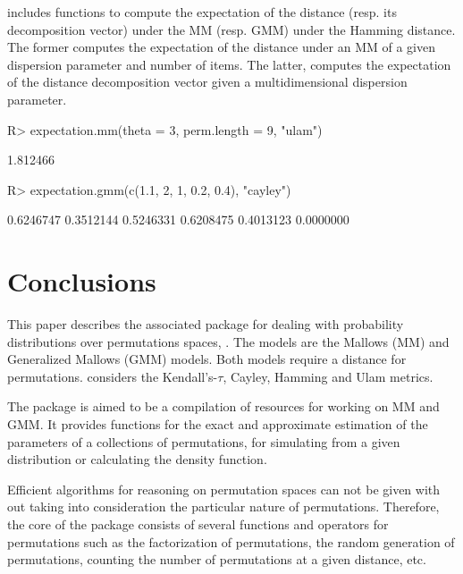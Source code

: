 \documentclass[article,nojss]{jss}
\begin{document}
 includes functions to compute the expectation of the distance (resp. its decomposition vector) under the MM (resp.  GMM) under the Hamming distance. The former computes the expectation of the distance under an MM of a given dispersion parameter and number of items. The latter, computes the expectation of the distance decomposition vector given a multidimensional dispersion parameter. 
\begin{Schunk}
\begin{Sinput}
R> expectation.mm(theta = 3, perm.length = 9, "ulam")
\end{Sinput}
\begin{Soutput}
[1] 1.812466
\end{Soutput}
\begin{Sinput}
R> expectation.gmm(c(1.1, 2, 1, 0.2, 0.4), "cayley")
\end{Sinput}
\begin{Soutput}
[1] 0.6246747 0.3512144 0.5246331 0.6208475 0.4013123 0.0000000
\end{Soutput}
\end{Schunk}
 

\section{Conclusions}
\label{sec:conclusion}
This paper describes the associated  package for dealing with probability distributions over permutations spaces, . The models are the Mallows (MM) and Generalized Mallows (GMM) models. Both models require a distance for permutations.  considers the Kendall's-$\tau$, Cayley, Hamming and Ulam metrics. 

The  package is aimed to be a compilation of resources for working on MM and GMM. It provides functions for the exact and approximate estimation of the parameters of a collections of permutations, for simulating from a given distribution or calculating the density function.

Efficient algorithms for reasoning on permutation spaces can not be given with out taking into consideration the particular nature of permutations. Therefore, the core of the  package consists of several functions and operators for permutations such as the factorization of permutations, the random generation of permutations, counting the number of permutations at a given distance, etc.
\end{document}
